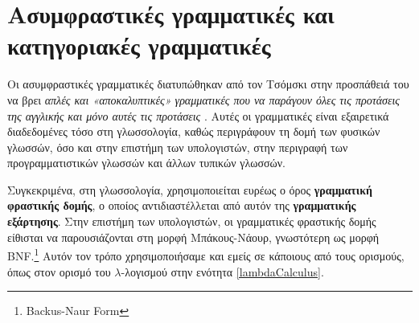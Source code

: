 \documentclass [a4paper,11pt] {book}
\theoremstyle{definition}
\theoremstyle{definition}
\begin{document}
\section{Ασυμφραστικές γραμματικές και κατηγοριακές γραμματικές}
Οι ασυμφραστικές γραμματικές διατυπώθηκαν από τον Τσόμσκι στην προσπάθειά του να βρει \textit{απλές και «αποκαλυπτικές» γραμματικές που να παράγουν όλες τις προτάσεις της αγγλικής και μόνο αυτές τις προτάσεις} \citep{citeulike:158531}. Αυτές οι γραμματικές είναι εξαιρετικά διαδεδομένες τόσο στη γλωσσολογία, καθώς περιγράφουν τη δομή των φυσικών γλωσσών, όσο και στην επιστήμη των υπολογιστών, στην περιγραφή των προγραμματιστικών γλωσσών και άλλων τυπικών γλωσσών.

Συγκεκριμένα, στη γλωσσολογία, χρησιμοποιείται ευρέως ο όρος \textbf{γραμματική φραστικής δομής}, ο οποίος αντιδιαστέλλεται από αυτόν της \textbf{γραμματικής εξάρτησης}. Στην επιστήμη των υπολογιστών, οι γραμματικές φραστικής δομής είθισται να παρουσιάζονται στη μορφή Μπάκους-Νάουρ, γνωστότερη ως μορφή BNF.\footnote{Backus-Naur Form} Αυτόν τον τρόπο χρησιμοποιήσαμε και εμείς σε κάποιους από τους ορισμούς, όπως στον ορισμό του $\lambda$-λογισμού στην ενότητα \ref{lambdaCalculus}.
\end{document}
